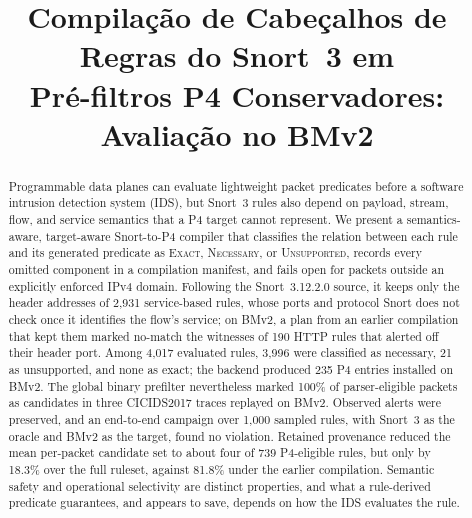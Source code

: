 \documentclass[conference]{IEEEtran}
\newcommand{\cls}[1]{\textsc{#1}}
\begin{document}
\title{Compilação de Cabeçalhos de Regras do Snort~3 em\\
Pré-filtros P4 Conservadores: Avaliação no BMv2}

\author{
\and
{}
}

\maketitle

\begin{abstract}
Programmable data planes can evaluate lightweight packet predicates before a
software intrusion detection system (IDS), but Snort~3 rules also depend on
payload, stream, flow, and service semantics that a P4 target cannot
represent. We present a semantics-aware, target-aware Snort-to-P4 compiler
that classifies the relation between each rule and its generated predicate as
\cls{Exact}, \cls{Necessary}, or \cls{Unsupported}, records every omitted
component in a compilation manifest, and fails open for packets outside an
explicitly enforced IPv4 domain. Following the Snort~3.12.2.0 source, it
keeps only the header addresses of 2,931 service-based rules, whose ports and
protocol Snort does not check once it identifies the flow's service; on
BMv2, a plan from an earlier compilation that kept them marked no-match the
witnesses of 190 HTTP rules that alerted off their header port. Among 4,017 evaluated
rules, 3,996 were classified as necessary, 21 as unsupported, and none as
exact; the backend produced 235 P4 entries installed on BMv2. The global
binary prefilter nevertheless marked 100\% of parser-eligible packets as
candidates in three CICIDS2017 traces replayed on BMv2. Observed alerts were
preserved, and an end-to-end campaign over 1,000 sampled rules, with Snort~3
as the oracle and BMv2 as the target, found no violation. Retained
provenance reduced the mean per-packet candidate set to about four of 739
P4-eligible rules, but only by 18.3\% over the full ruleset, against 81.8\%
under the earlier compilation. Semantic safety and operational selectivity
are distinct properties, and what a rule-derived predicate guarantees, and
appears to save, depends on how the IDS evaluates the rule.
\end{abstract}
\end{document}
